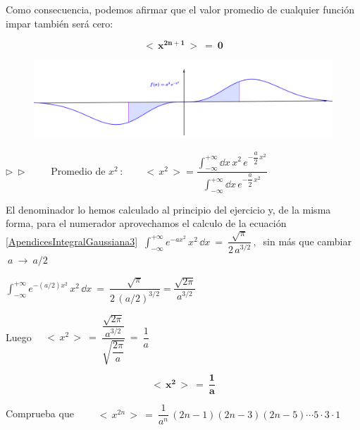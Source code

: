 Como consecuencia, podemos afirmar que el valor promedio de cualquier función impar también será cero:

\begin{equation}
\label{Promedio-x-impar}
\boldsymbol{ \ \boxed { \ 
<\, x^{2n+1}\, > \ = \ 0
\ } \ }	
\end{equation}

\begin{figure}[H]
	\centering
	\includegraphics[width=1\textwidth]{imagenes/apendices-01-10.png}
\end{figure}


\vspace{5mm} $\boldsymbol \triangleright \ \triangleright \qquad $ Promedio de $x^2\, :  \qquad <\, x^2\, >=  \dfrac
{\displaystyle \int_{-\infty}^{+\infty} \dd x \, x^2\, e^{-\dfrac a 2 \, x^2}}
{\displaystyle \int_{-\infty}^{+\infty} \dd x \, e^{-\dfrac a 2 \, x^2}} $

El denominador lo hemos calculado al principio del ejercicio y, de la misma forma, para el numerador aprovechamos el calculo de la ecuación \ref{ApendicesIntegralGaussiana3}
$\ \displaystyle  \int_{-\infty}^{+\infty} e^{-ax^2}\, x^2 \, \dd x  \ = \ \dfrac{\sqrt{\pi}}{2\, a^{3/2}} \, , \ $ sin más que cambiar $\ a \ \to \ a/2$

$\displaystyle \int_{-\infty}^{+\infty} e^{-(a/2)x^2}\, x^2 \, \dd x  \ = \ \dfrac{\sqrt{\pi}}{2\, (a/2)^{3/2}} =\dfrac{\sqrt{2\pi}}{a^{3/2}}$

Luego $\quad <\, x^2 \, > \ = \ \dfrac { \dfrac{\sqrt{2\pi}}{a^{3/2}} }{ \sqrt{ \dfrac{2\pi}{a} }  } \ = \ \dfrac 1 a$



\begin{equation}
\label{Promedio-x2}
\boldsymbol{ \boxed{ \ 
<\, x^2\, > \ = \ \dfrac{1}{a}
\ } }	
\end{equation}

\color{black}

\vspace{10mm}
\begin{ejercicio}
Comprueba que $\qquad <\, x^{2n} \, > \ = \ \dfrac 1{a^n} \, (2n-1)(2n-3)(2n-5) \cdots 5\cdot 3 \cdot 1 $
\end{ejercicio}
\vspace{5mm}

